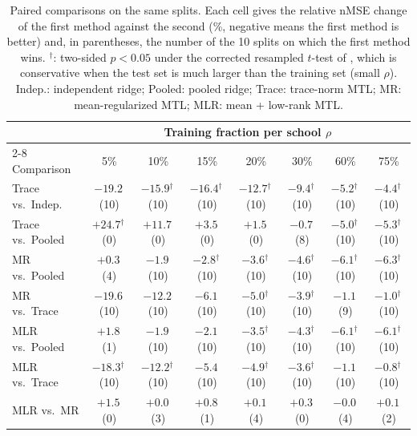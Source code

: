 \begin{table}[t]
\centering
\caption{Paired comparisons on the same splits. Each cell gives the relative nMSE change of the first method against the second (\%, negative means the first method is better) and, in parentheses, the number of the 10 splits on which the first method wins. $^{\dagger}$: two-sided $p < 0.05$ under the corrected resampled $t$-test of \citet{nadeau2003inference}, which is conservative when the test set is much larger than the training set (small $\rho$). Indep.: independent ridge; Pooled: pooled ridge; Trace: trace-norm MTL; MR: mean-regularized MTL; MLR: mean + low-rank MTL.}
\label{tab:paired}
\footnotesize
\setlength{\tabcolsep}{4.2pt}
\begin{tabular}{@{}lccccccc@{}}
\toprule
& \multicolumn{7}{c}{Training fraction per school $\rho$} \\
\cmidrule(l){2-8}
Comparison & 5\% & 10\% & 15\% & 20\% & 30\% & 60\% & 75\% \\
\midrule
Trace vs.\ Indep. & $-19.2$\,{\scriptsize(10)} & $-15.9$$^{\dagger}$\,{\scriptsize(10)} & $-16.4$$^{\dagger}$\,{\scriptsize(10)} & $-12.7$$^{\dagger}$\,{\scriptsize(10)} & $-9.4$$^{\dagger}$\,{\scriptsize(10)} & $-5.2$$^{\dagger}$\,{\scriptsize(10)} & $-4.4$$^{\dagger}$\,{\scriptsize(10)} \\
Trace vs.\ Pooled & $+24.7$$^{\dagger}$\,{\scriptsize(0)} & $+11.7$\,{\scriptsize(0)} & $+3.5$\,{\scriptsize(0)} & $+1.5$\,{\scriptsize(0)} & $-0.7$\,{\scriptsize(8)} & $-5.0$$^{\dagger}$\,{\scriptsize(10)} & $-5.3$$^{\dagger}$\,{\scriptsize(10)} \\
MR vs.\ Pooled & $+0.3$\,{\scriptsize(4)} & $-1.9$\,{\scriptsize(10)} & $-2.8$$^{\dagger}$\,{\scriptsize(10)} & $-3.6$$^{\dagger}$\,{\scriptsize(10)} & $-4.6$$^{\dagger}$\,{\scriptsize(10)} & $-6.1$$^{\dagger}$\,{\scriptsize(10)} & $-6.3$$^{\dagger}$\,{\scriptsize(10)} \\
MR vs.\ Trace & $-19.6$\,{\scriptsize(10)} & $-12.2$\,{\scriptsize(10)} & $-6.1$\,{\scriptsize(10)} & $-5.0$$^{\dagger}$\,{\scriptsize(10)} & $-3.9$$^{\dagger}$\,{\scriptsize(10)} & $-1.1$\,{\scriptsize(9)} & $-1.0$$^{\dagger}$\,{\scriptsize(10)} \\
MLR vs.\ Pooled & $+1.8$\,{\scriptsize(1)} & $-1.9$\,{\scriptsize(10)} & $-2.1$\,{\scriptsize(10)} & $-3.5$$^{\dagger}$\,{\scriptsize(10)} & $-4.3$$^{\dagger}$\,{\scriptsize(10)} & $-6.1$$^{\dagger}$\,{\scriptsize(10)} & $-6.1$$^{\dagger}$\,{\scriptsize(10)} \\
MLR vs.\ Trace & $-18.3$$^{\dagger}$\,{\scriptsize(10)} & $-12.2$$^{\dagger}$\,{\scriptsize(10)} & $-5.4$\,{\scriptsize(10)} & $-4.9$$^{\dagger}$\,{\scriptsize(10)} & $-3.6$$^{\dagger}$\,{\scriptsize(10)} & $-1.1$\,{\scriptsize(10)} & $-0.8$$^{\dagger}$\,{\scriptsize(10)} \\
MLR vs.\ MR & $+1.5$\,{\scriptsize(0)} & $+0.0$\,{\scriptsize(3)} & $+0.8$\,{\scriptsize(1)} & $+0.1$\,{\scriptsize(4)} & $+0.3$\,{\scriptsize(0)} & $-0.0$\,{\scriptsize(4)} & $+0.1$\,{\scriptsize(2)} \\
\bottomrule
\end{tabular}
\end{table}
